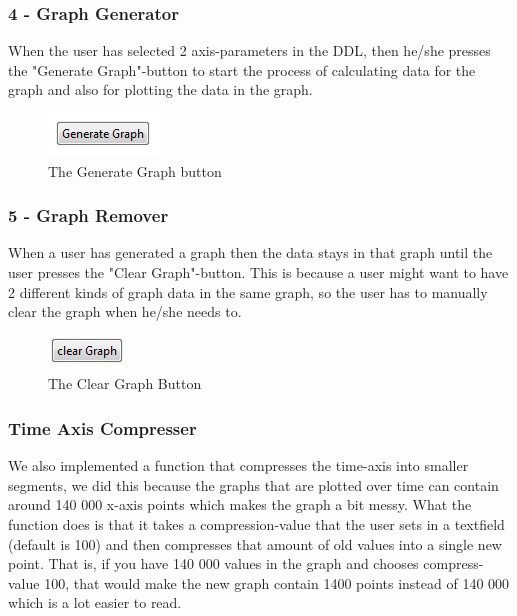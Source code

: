 \documentclass[cropmarks, frame, english]{idamasterthesis}
\begin{document}
\subsubsection{4 - Graph Generator}
When the user has selected 2 axis-parameters in the DDL, then he/she presses the "Generate Graph"-button to start the process of calculating data for the graph and also for plotting the data in the graph.

\begin{figure}[H]
\includegraphics[scale=0.7]{Generate_Graph}
\centering
\caption{The Generate Graph button}
\end{figure}

\subsubsection{5 - Graph Remover}
When a user has generated a graph then the data stays in that graph until the user presses the "Clear Graph"-button. This is because a user might want to have 2 different kinds of graph data in the same graph, so the user has to manually clear the graph when he/she needs to.

\begin{figure}[H]
\includegraphics[scale=0.7]{Clear_Graph}
\centering
\caption{The Clear Graph Button}
\end{figure}

\subsubsection{Time Axis Compresser}
We also implemented a function that compresses the time-axis into smaller segments, we did this because the graphs that are plotted over time can contain around 140 000 x-axis points which makes the graph a bit messy. What the function does is that it takes a compression-value that the user sets in a textfield (default is 100) and then compresses that amount of old values into a single new point. That is, if you have 140 000 values in the graph and chooses compress-value 100, that would make the new graph contain 1400 points instead of 140 000 which is a lot easier to read. \\
\end{document}
